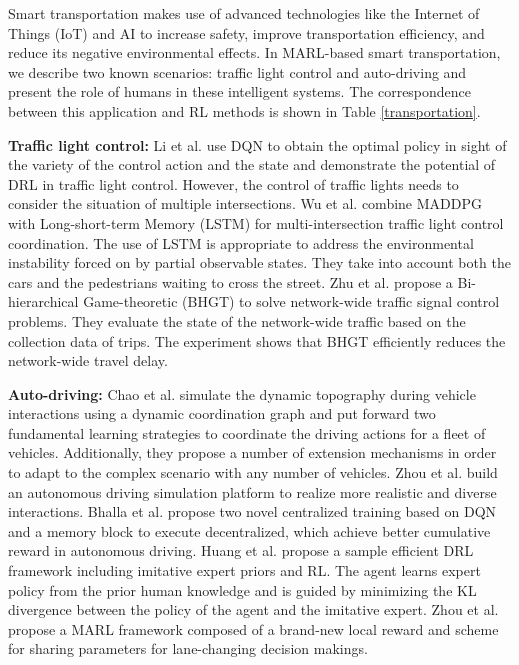 \documentclass[acmsmall]{acmart}
\begin{document}

Smart transportation makes use of advanced technologies like the Internet of Things (IoT) and AI to increase safety, improve transportation efficiency, and reduce its negative environmental effects.
In MARL-based smart transportation, we describe two known scenarios: traffic light control and auto-driving  and present the role of humans in these intelligent systems. The correspondence between this application and RL methods is shown in Table \ref{transportation}.

\textbf{Traffic light control:} Li et al. \cite{7508798} use DQN to obtain the optimal policy in sight of the variety of the control action and the state and demonstrate the potential of DRL in traffic light control. However, the control of traffic lights needs to consider the situation of multiple intersections. Wu et al. \cite{9103316} combine MADDPG with Long-short-term Memory (LSTM) for multi-intersection traffic light control coordination. The use of LSTM is appropriate to address the environmental instability forced on by partial observable states. They take into account both the cars and the pedestrians waiting to cross the street. Zhu et al. \cite{9681232} propose a Bi-hierarchical Game-theoretic (BHGT) to solve network-wide traffic signal control problems. They evaluate the state of the network-wide traffic based on the collection data of trips. The experiment shows that BHGT efficiently reduces the network-wide travel delay. 

\textbf{Auto-driving:} Chao et al. \cite{8638814}  simulate the dynamic topography during vehicle interactions using a dynamic coordination graph and put forward two fundamental learning strategies to coordinate the driving actions for a fleet of vehicles. Additionally, they propose a number of extension mechanisms in order to adapt to the complex scenario with any number of vehicles.
Zhou et al. \cite{pmlr-v155-zhou21a} build an autonomous driving simulation platform to realize more realistic and diverse interactions.
Bhalla et al. \cite{10.1007/978-3-030-47358-7_7} propose two novel centralized training based on DQN and a memory block to execute decentralized, which achieve better cumulative reward in autonomous driving.
Huang et al. \cite{9694460} propose a sample efficient DRL framework including imitative expert priors and RL. The agent learns expert policy from the prior human knowledge and is guided by minimizing the KL divergence between the policy of the agent and the imitative expert. 
Zhou et al. \cite{zhou2022multi} propose a MARL framework composed of a brand-new local reward and scheme for sharing parameters for lane-changing decision makings.
\end{document}
